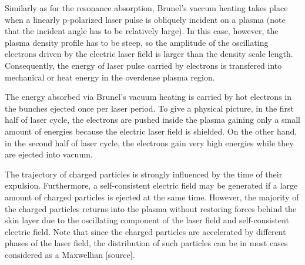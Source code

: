 Similarly as for the resonance absorption, Brunel's vaccum heating takes place when a linearly p-polarized laser pulse is obliquely incident on a plasma (note that the incident angle has to be relatively large). In this case, however, the plasma density profile has to be steep, so the amplitude of the oscillating electrons driven by the electric laser field is larger than the density scale length. Consequently, the energy of laser pulse carried by electrons is transfered into mechanical or heat energy in the overdense plasma region.

The energy absorbed via Brunel's vacuum heating is carried by hot electrons in the bunches
ejected once per laser period. To give a physical picture, in the first half of laser cycle, the electrons are pushed inside the plasma gaining only a small amount of energies because the electric laser field is shielded. On the other hand, in the second half of laser cycle, the electrons gain very high energies while they are ejected into vacuum.

The trajectory of charged particles is strongly influenced by the time of their expulsion. Furthermore, a self-consistent electric field may be generated if a large amount of charged particles is ejected at the same time. However, the majority of the charged particles returns into the plasma without restoring forces behind the skin layer due to the oscillating component of the laser field and self-consistent electric field. Note that since the charged particles are accelerated by different phases of the laser field, the distribution of such particles can be in most cases considered as a Maxwellian [source].